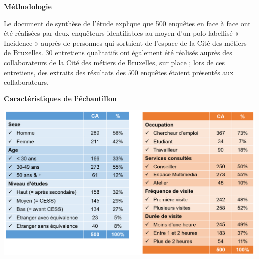 \documentclass[french,a4paper,12pt]{article}
\begin{document}
\textbf{Méthodologie}

Le document de synthèse de l’étude explique que 500 enquêtes en face à face ont été réalisées par deux enquêteurs identifiables au moyen d’un polo labellisé « Incidence » auprès de personnes qui sortaient de l’espace de la Cité des métiers de Bruxelles. 30 entretiens qualitatifs ont également été réalisés auprès des collaborateurs de la Cité des métiers de Bruxelles, sur place ; lors de ces entretiens, des extraits des résultats des 500 enquêtes étaient présentés aux collaborateurs.

\textbf{Caractéristiques de l’échantillon}

\includegraphics[scale=0.3]{8-cdm-echantillon1.PNG}
\end{document}

